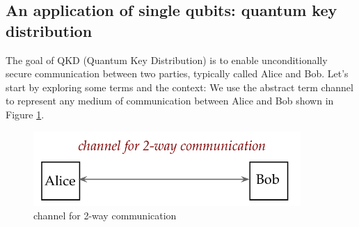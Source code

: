 \documentclass[main.tex]{subfiles}
\begin{document}
\subsection{An application of single qubits: quantum key distribution}

    The goal of QKD (Quantum Key Distribution) is to enable unconditionally secure communication between two parties, typically called Alice and Bob. Let's start by exploring some terms and the context: We use the abstract term channel to represent any medium of communication between Alice and Bob shown in Figure \ref{fig:30channel}.
    
    \begin{figure}
        \centering
        \includegraphics[width=4in]{notes/figs/n05/30channel.png}
        \caption{channel for 2-way communication}
        \label{fig:30channel}
    \end{figure}
    
\end{document}
